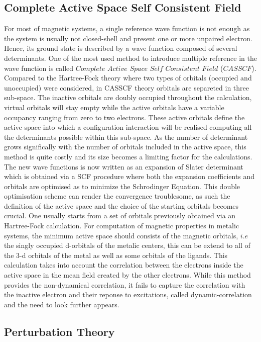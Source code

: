\documentclass[12pt]{article}
\numberwithin{equation}{section}
\begin{document}
\subsection{Complete Active Space Self Consistent Field}

For most of magnetic systems, a single reference wave function is not enough as the system is usually not closed-shell and present one or more unpaired electron. Hence, its ground state is described by a wave function composed of several determinants.
One of the most used method to introduce multiple reference in the wave function is called $Complete$ $Active$ $Space$ $Self$ $Consistent$ $Field$ ($CASSCF$). 
Compared to the Hartree-Fock theory where two types of orbitals (occupied and unoccupied) were considered, in CASSCF theory orbitals are separeted in three sub-space. The inactive orbitals are doubly occupied throughout the calculation, virtual orbitals will stay empty while the active orbitals have a variable occupancy ranging from zero to two electrons.
These active orbitals define the active space into which a configuration interaction will be realised computing all the determinants possible within this sub-space. 
As the number of determinant grows significally with the number of orbitals included in the active space, this method is quite costly and its size becomes a limiting factor for the calculations.
The new wave functions is now written as an expansion of Slater determinant which is obtained via a SCF procedure where both the expansion coefficients and orbitals are optimised as to minimize the Schrodinger Equation. 
This double optimisation scheme can render the convergence troublesome, as such the definition of the active space and the choice of the starting orbitals becomes crucial. One usually starts from a set of orbitals previously obtained via an Hartree-Fock calculation.
For computation of magnetic properties in metalic systems, the minimum active space should consists of the magnetic orbitals, $i.e$ the singly occupied d-orbitals of the metalic centers, this can be extend to all of the 3-d orbitals of the metal as well as some orbitals of the ligands.
This calculation takes into account the correlation between the electrons inside the active space in the mean field created by the
other electrons. While this method provides the non-dynamical correlation, it fails to capture the correlation with the inactive electron and their reponse to excitations, called dynamic-correlation and the need to look further appears.


\subsection{Perturbation Theory}
\end{document}
